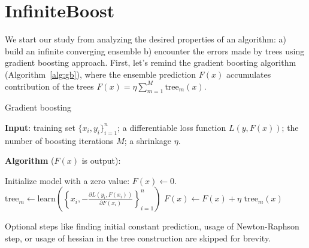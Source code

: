 \section{InfiniteBoost}
We start our study from analyzing the desired properties of an algorithm:
a) build an infinite converging ensemble b) encounter the errors made by trees using gradient boosting approach. First, let's remind the gradient boosting algorithm (Algorithm~\ref{alg:gb}),
where the ensemble prediction $F(x)$ accumulates contribution of the trees $ F(x) = \eta \sum_{m=1}^M \text{tree}_m(x) $.

\begin{algorithm}[!h]
  \caption{Gradient boosting}\label{alg:gb}
  {\bf Input}: training set $\{x_i, y_i\}_{i=1}^n$; a differentiable loss function $L(y, F(x))$; the number of boosting iterations $M$; a shrinkage $\eta$.

  {\bf Algorithm} ($F(x)$ is output):
  \begin{algorithmic}
    \State Initialize model with a zero value: $F(x) \gets 0$.
      \State $\text{tree}_m \gets \text{learn}\left(\left\{x_i, -\frac{\partial L(y_i, F(x_i))}{\partial F(x_i)}\right\}_{i=1}^n\right)$
      \State $F(x) \gets F(x) + \eta \text{ tree}_m(x)$
    \EndFor
  \end{algorithmic}

  Optional steps like finding initial constant prediction, usage of Newton-Raphson step,
  or usage of hessian in the tree construction are skipped for brevity.
\end{algorithm}

